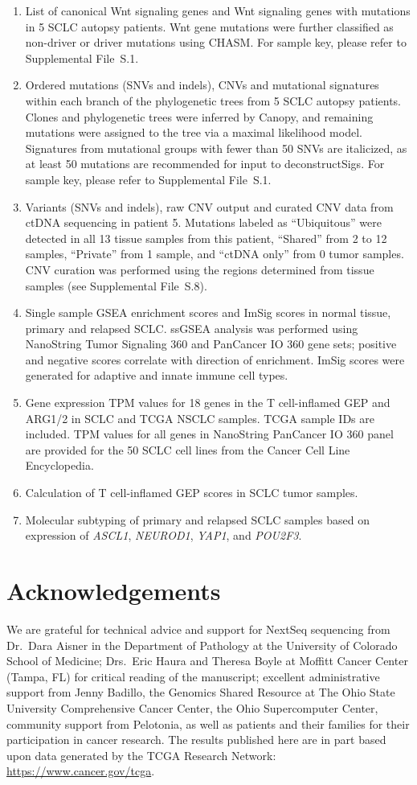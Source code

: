 \begin{enumerate}
    \item List of canonical Wnt signaling genes and Wnt signaling genes with mutations in 5 SCLC autopsy patients. Wnt gene mutations were further classified as non-driver or driver mutations using CHASM\@. For sample key, please refer to Supplemental File~S\thechapter{}.1.
    \item Ordered mutations (SNVs and indels), CNVs and mutational signatures within each branch of the phylogenetic trees from 5 SCLC autopsy patients. Clones and phylogenetic trees were inferred by Canopy, and remaining mutations were assigned to the tree via a maximal likelihood model. Signatures from mutational groups with fewer than 50 SNVs are italicized, as at least 50 mutations are recommended for input to deconstructSigs. For sample key, please refer to Supplemental File~S\thechapter{}.1.
    \item Variants (SNVs and indels), raw CNV output and curated CNV data from ctDNA sequencing in patient 5. Mutations labeled as ``Ubiquitous'' were detected in all 13 tissue samples from this patient, ``Shared'' from 2 to 12 samples, ``Private'' from 1 sample, and ``ctDNA only'' from 0 tumor samples. CNV curation was performed using the regions determined from tissue samples (see Supplemental File~S\thechapter{}.8).
    \item Single sample GSEA enrichment scores and ImSig scores in normal tissue, primary and relapsed SCLC\@. ssGSEA analysis was performed using NanoString Tumor Signaling 360 and PanCancer IO 360 gene sets; positive and negative scores correlate with direction of enrichment. ImSig scores were generated for adaptive and innate immune cell types.
    \item Gene expression TPM values for 18 genes in the T cell-inflamed GEP and ARG1/2 in SCLC and TCGA NSCLC samples. TCGA sample IDs are included. TPM values for all genes in NanoString PanCancer IO 360 panel are provided for the 50 SCLC cell lines from the Cancer Cell Line Encyclopedia. 
    \item Calculation of T cell-inflamed GEP scores in SCLC tumor samples.
    \item Molecular subtyping of primary and relapsed SCLC samples based on expression of \textit{ASCL1}, \textit{NEUROD1}, \textit{YAP1}, and \textit{POU2F3}.
\end{enumerate}

\section*{Acknowledgements}
We are grateful for technical advice and support for NextSeq sequencing from Dr.\ Dara Aisner in the Department of Pathology at the University of Colorado School of Medicine; Drs.\ Eric Haura and Theresa Boyle at Moffitt Cancer Center (Tampa, FL) for critical reading of the manuscript; excellent administrative support from Jenny Badillo, the Genomics Shared Resource at The Ohio State University Comprehensive Cancer Center, the Ohio Supercomputer Center, community support from Pelotonia, as well as patients and their families for their participation in cancer research. The results published here are in part based upon data generated by the TCGA Research Network: \url{https://www.cancer.gov/tcga}.